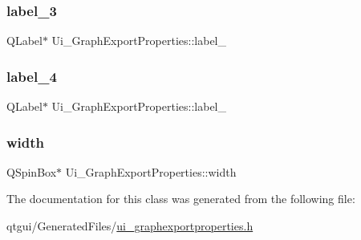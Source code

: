 \subsubsection{\texorpdfstring{label\_3}{label\_3}}
{\footnotesize\ttfamily Q\+Label$\ast$ Ui\+\_\+\+Graph\+Export\+Properties\+::label\+\_}

\mbox{\label{class_ui___graph_export_properties_afad676c8181f3542550ca8965ee36dd3}} 
\subsubsection{\texorpdfstring{label\_4}{label\_4}}
{\footnotesize\ttfamily Q\+Label$\ast$ Ui\+\_\+\+Graph\+Export\+Properties\+::label\+\_}

\mbox{\label{class_ui___graph_export_properties_a017e06a0988d41d4cb2bf72b2b5ce937}} 
\subsubsection{\texorpdfstring{width}{width}}
{\footnotesize\ttfamily Q\+Spin\+Box$\ast$ Ui\+\_\+\+Graph\+Export\+Properties\+::width}



The documentation for this class was generated from the following file\+:\begin{DoxyCompactItemize}
\item 
qtgui/\+Generated\+Files/\mbox{\hyperlink{ui__graphexportproperties_8h}{ui\+\_\+graphexportproperties.\+h}}\end{DoxyCompactItemize}

